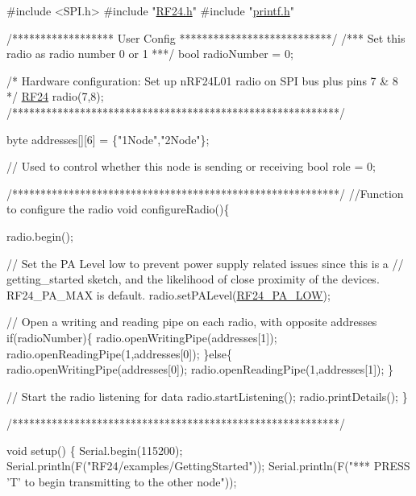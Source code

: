 \begin{DoxyCodeInclude}
\textcolor{preprocessor}{#include <SPI.h>}
\textcolor{preprocessor}{#include "\hyperlink{RF24_8h}{RF24.h}"}
\textcolor{preprocessor}{#include "\hyperlink{printf_8h}{printf.h}"}

\textcolor{comment}{/****************** User Config ***************************/}
\textcolor{comment}{/***      Set this radio as radio number 0 or 1         ***/}
\textcolor{keywordtype}{bool} radioNumber = 0;

\textcolor{comment}{/* Hardware configuration: Set up nRF24L01 radio on SPI bus plus pins 7 & 8 */}
\hyperlink{classRF24}{RF24} radio(7,8);
\textcolor{comment}{/**********************************************************/}

byte addresses[][6] = \{\textcolor{stringliteral}{"1Node"},\textcolor{stringliteral}{"2Node"}\};

\textcolor{comment}{// Used to control whether this node is sending or receiving}
\textcolor{keywordtype}{bool} role = 0;

\textcolor{comment}{/**********************************************************/}
\textcolor{comment}{//Function to configure the radio}
\textcolor{keywordtype}{void} configureRadio()\{

  radio.begin();

  \textcolor{comment}{// Set the PA Level low to prevent power supply related issues since this is a}
 \textcolor{comment}{// getting\_started sketch, and the likelihood of close proximity of the devices. RF24\_PA\_MAX is default.}
  radio.setPALevel(\hyperlink{RF24_8h_a1e4cd0bea93e6b43422855fb0120aacea7d8d09f4a047b7c22655e56c98ca010c}{RF24\_PA\_LOW});
  
  \textcolor{comment}{// Open a writing and reading pipe on each radio, with opposite addresses}
  \textcolor{keywordflow}{if}(radioNumber)\{
    radio.openWritingPipe(addresses[1]);
    radio.openReadingPipe(1,addresses[0]);
  \}\textcolor{keywordflow}{else}\{
    radio.openWritingPipe(addresses[0]);
    radio.openReadingPipe(1,addresses[1]);
  \}
  
  \textcolor{comment}{// Start the radio listening for data}
  radio.startListening();
  radio.printDetails();
\}

\textcolor{comment}{/**********************************************************/}

\textcolor{keywordtype}{void} setup() \{
  Serial.begin(115200);
  Serial.println(F(\textcolor{stringliteral}{"RF24/examples/GettingStarted"}));
  Serial.println(F(\textcolor{stringliteral}{"*** PRESS 'T' to begin transmitting to the other node"}));


\end{DoxyCodeInclude}
